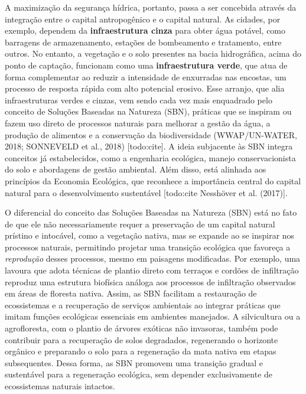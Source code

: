 \documentclass[./main.tex]{subfiles}
\begin{document}
\par A maximização da segurança hídrica, portanto, passa a ser concebida através da integração entre o capital antropogênico e o capital natural. As cidades, por exemplo, dependem da \textbf{infraestrutura cinza} para obter água potável, como barragens de armazenamento, estações de bombeamento e tratamento, entre outros. No entanto, a vegetação e o solo presentes na bacia hidrográfica, acima do ponto de captação, funcionam como uma \textbf{infraestrutura verde}, que atua de forma complementar ao reduzir a intensidade de enxurradas nas encostas, um processo de resposta rápida com alto potencial erosivo. Esse arranjo, que alia infraestruturas verdes e cinzas, vem sendo cada vez mais enquadrado pelo conceito de Soluções Baseadas na Natureza (SBN), práticas que se inspiram ou fazem uso direto de processos naturais para melhorar a gestão da água, a produção de alimentos e a conservação da biodiversidade (WWAP/UN-WATER, 2018; SONNEVELD et al., 2018) [todo:cite]. A ideia subjacente às SBN integra conceitos já estabelecidos, como a engenharia ecológica, manejo conservacionista do solo e abordagens de gestão ambiental. Além disso, está alinhada aos princípios da Economia Ecológica, que reconhece a importância central do capital natural para o desenvolvimento sustentável [todo:cite Nesshöver et al. (2017)].

\par O diferencial do conceito das Soluções Baseadas na Natureza (SBN) está no fato de que ele não necessariamente requer a preservação de um capital natural prístino e intocável, como a vegetação nativa, mas se expande ao se inspirar nos processos naturais, permitindo projetar uma transição ecológica que favoreça a \textit{reprodução} desses processos, mesmo em paisagens modificadas. Por exemplo, uma lavoura que adota técnicas de plantio direto com terraços e cordões de infiltração reproduz uma estrutura biofísica análoga aos processos de infiltração observados em áreas de floresta nativa. Assim, as SBN facilitam a restauração de ecossistemas e a recuperação de serviços ambientais ao integrar práticas que imitam funções ecológicas essenciais em ambientes manejados. A silvicultura ou a agrofloresta, com o plantio de árvores exóticas não invasoras, também pode contribuir para a recuperação de solos degradados, regenerando o horizonte orgânico e preparando o solo para a regeneração da mata nativa em etapas subsequentes. Dessa forma, as SBN promovem uma transição gradual e sustentável para a regeneração ecológica, sem depender exclusivamente de ecossistemas naturais intactos.
\end{document}
